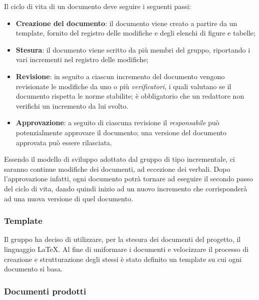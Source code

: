 Il ciclo di vita di un documento deve seguire i seguenti passi:
\begin{itemize}
    \item \textbf{Creazione del documento}: il documento viene creato a partire da un template, fornito del registro delle 
    	modifiche e degli elenchi di figure e tabelle;
    \item \textbf{Stesura}: il documento viene scritto da più membri del gruppo, riportando i vari incrementi nel registro delle modifiche;
    \item \textbf{Revisione}: in seguito a ciascun incremento del documento vengono revisionate le modifiche da uno o più 
    	\emph{verificatori}, i quali valutano se il documento rispetta le norme stabilite; \`{e} obbligatorio che un redattore non verifichi 
    	un incremento da lui svolto.
    \item \textbf{Approvazione}: a seguito di ciascuna revisione il \emph{responsabile} pu\`{o} potenzialmente approvare il documento; una 
    	versione del documento approvata pu\`{o} essere rilasciata.
\end{itemize}
Essendo il modello di sviluppo adottato dal gruppo di tipo incrementale, ci saranno continue modifiche dei documenti, ad eccezione dei verbali. 
Dopo l'approvazione infatti, ogni documento potrà tornare ad eseguire il secondo passo del ciclo di vita, dando quindi inizio ad un nuovo 
incremento che corrisponderà ad una nuova versione di quel documento.

\subsubsection{Template}
\label{ssub:template}

Il gruppo ha deciso di utilizzare, per la stesura dei documenti del progetto, il linguaggio \LaTeX. Al fine di 
uniformare i documenti e velocizzare il processo di creazione e strutturazione degli stessi è stato definito un 
template su cui ogni documento si basa.

\subsubsection{Documenti prodotti}
\label{ssub:documenti_prodotti}

